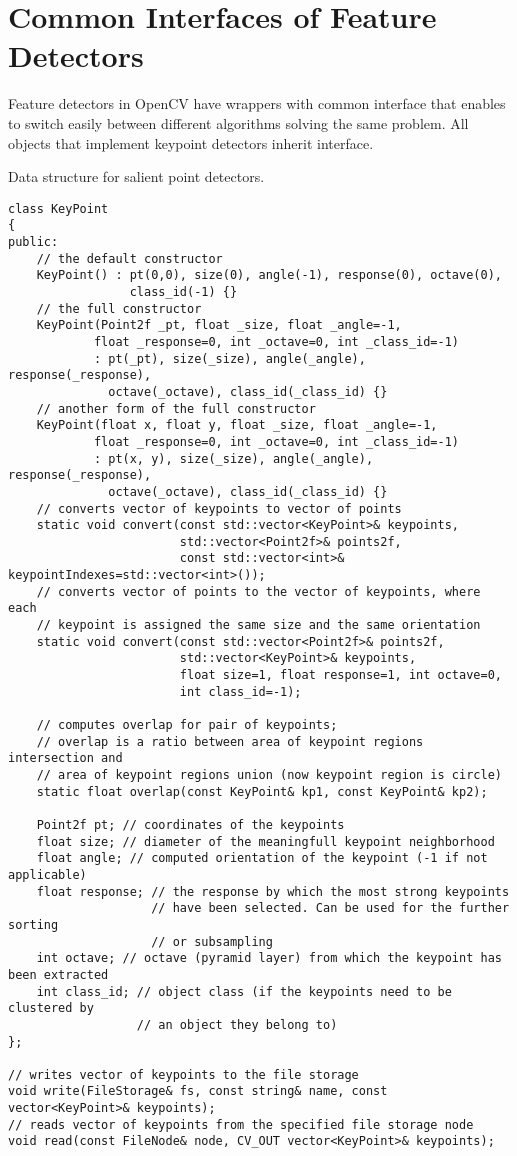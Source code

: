 \ifCpp
\section{Common Interfaces of Feature Detectors}
Feature detectors in OpenCV have wrappers with common interface that enables to switch easily 
between different algorithms solving the same problem. All objects that implement keypoint detectors 
inherit  interface.

Data structure for salient point detectors.

\begin{lstlisting}
class KeyPoint
{
public:
    // the default constructor
    KeyPoint() : pt(0,0), size(0), angle(-1), response(0), octave(0), 
                 class_id(-1) {}
    // the full constructor
    KeyPoint(Point2f _pt, float _size, float _angle=-1,
            float _response=0, int _octave=0, int _class_id=-1)
            : pt(_pt), size(_size), angle(_angle), response(_response), 
              octave(_octave), class_id(_class_id) {}
    // another form of the full constructor
    KeyPoint(float x, float y, float _size, float _angle=-1,
            float _response=0, int _octave=0, int _class_id=-1)
            : pt(x, y), size(_size), angle(_angle), response(_response), 
              octave(_octave), class_id(_class_id) {}
    // converts vector of keypoints to vector of points
    static void convert(const std::vector<KeyPoint>& keypoints,
                        std::vector<Point2f>& points2f,
                        const std::vector<int>& keypointIndexes=std::vector<int>());
    // converts vector of points to the vector of keypoints, where each 
    // keypoint is assigned the same size and the same orientation
    static void convert(const std::vector<Point2f>& points2f,
                        std::vector<KeyPoint>& keypoints,
                        float size=1, float response=1, int octave=0, 
                        int class_id=-1);

    // computes overlap for pair of keypoints;
    // overlap is a ratio between area of keypoint regions intersection and
    // area of keypoint regions union (now keypoint region is circle)
    static float overlap(const KeyPoint& kp1, const KeyPoint& kp2);

    Point2f pt; // coordinates of the keypoints
    float size; // diameter of the meaningfull keypoint neighborhood
    float angle; // computed orientation of the keypoint (-1 if not applicable)
    float response; // the response by which the most strong keypoints 
                    // have been selected. Can be used for the further sorting 
                    // or subsampling
    int octave; // octave (pyramid layer) from which the keypoint has been extracted
    int class_id; // object class (if the keypoints need to be clustered by 
                  // an object they belong to) 
};

// writes vector of keypoints to the file storage
void write(FileStorage& fs, const string& name, const vector<KeyPoint>& keypoints);
// reads vector of keypoints from the specified file storage node
void read(const FileNode& node, CV_OUT vector<KeyPoint>& keypoints);    
\end{lstlisting}

